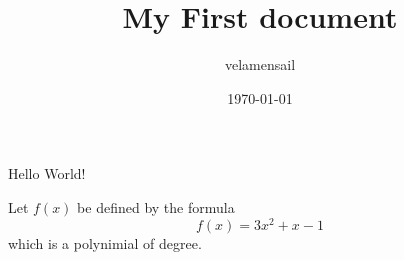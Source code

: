 \documentclass{article}     %
\title{My First document}   %
\author{velamensail}    %
\date{\today}   %
\begin{document}
    \maketitle %
    Hello World!

    Let $f(x)$ be defined by the formula $$f(x)=3x^2+x-1$$which is a polynimial of degree.  %
\end{document}
